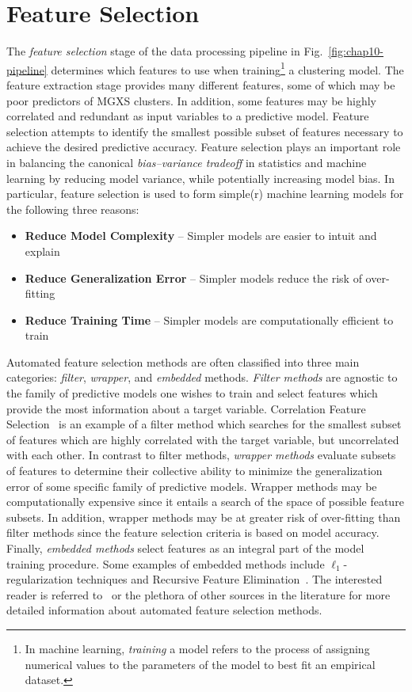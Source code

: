 \section{Feature Selection}
\label{sec:chap10-feature-select}

The \textit{feature selection} stage of the data processing pipeline in Fig.~\ref{fig:chap10-pipeline} determines which features to use when training\footnote{In machine learning, \textit{training} a model refers to the process of assigning numerical values to the parameters of the model to best fit an empirical dataset.} a clustering model. The feature extraction stage provides many different features, some of which may be poor predictors of \ac{MGXS} clusters. In addition, some features may be highly correlated and redundant as input variables to a predictive model. Feature selection attempts to identify the smallest possible subset of features necessary to achieve the desired predictive accuracy. Feature selection plays an important role in balancing the canonical \textit{bias--variance tradeoff} in statistics and machine learning by reducing model variance, while potentially increasing model bias. In particular, feature selection is used to form simple(r) machine learning models for the following three reasons:

\begin{itemize}[noitemsep]
\item \textbf{Reduce Model Complexity} -- Simpler models are easier to intuit and explain
\item \textbf{Reduce Generalization Error} -- Simpler models reduce the risk of over-fitting
\item \textbf{Reduce Training Time} -- Simpler models are computationally efficient to train
\end{itemize}

Automated feature selection methods are often classified into three main categories: \textit{filter}, \textit{wrapper}, and \textit{embedded} methods. \textit{Filter methods} are agnostic to the family of predictive models one wishes to train and select features which provide the most information about a target variable. Correlation Feature Selection~\cite{hall1999correlation} is an example of a filter method which searches for the smallest subset of features which are highly correlated with the target variable, but uncorrelated with each other. In contrast to filter methods, \textit{wrapper methods} evaluate subsets of features to determine their collective ability to minimize the generalization error of some specific family of predictive models. Wrapper methods may be computationally expensive since it entails a search of the space of possible feature subsets. In addition, wrapper methods may be at greater risk of over-fitting than filter methods since the feature selection criteria is based on model accuracy. Finally, \textit{embedded methods} select features as an integral part of the model training procedure. Some examples of embedded methods include $\ell_{1}$-regularization techniques and Recursive Feature Elimination~\cite{guyon2002rfe}. The interested reader is referred to~\cite{guyon2003select} or the plethora of other sources in the literature for more detailed information about automated feature selection methods.

